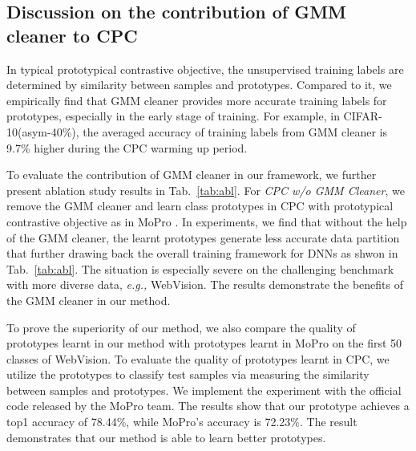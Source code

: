 \documentclass{article} \usepackage{iclr2023_conference,times}
\begin{document}
\subsection{Discussion on the contribution of GMM cleaner to CPC} \label{app:abl}


  In typical prototypical contrastive objective, the unsupervised training labels are determined by similarity between samples and prototypes. Compared to it, we empirically find that GMM cleaner provides more accurate training labels for prototypes, especially in the early stage of training. For example, in CIFAR-10(asym-40\%), the averaged accuracy of training labels from GMM cleaner is 9.7\% higher during the CPC warming up period. 
  
  To evaluate the contribution of GMM cleaner in our framework, we further present ablation study results in Tab.~\ref{tab:abl}. For \emph{CPC w/o GMM Cleaner}, we remove the GMM cleaner and learn class prototypes in CPC with prototypical contrastive objective as in MoPro \citep{li2020mopro}. In experiments, we find that without the help of the GMM cleaner, the learnt prototypes generate less accurate data partition that further drawing back the overall training framework for DNNs as shwon in Tab.~\ref{tab:abl}. The situation is especially severe on the challenging benchmark with more diverse data, \emph{e.g.,} WebVision.  The results demonstrate the benefits of the GMM cleaner in our method. 
  
  To prove the superiority of our method, we also compare the quality of prototypes learnt in our method with prototypes learnt in MoPro \citep{li2020mopro} on the first 50 classes of WebVision.
  To evaluate the quality of prototypes learnt in CPC, we utilize the prototypes to classify test samples via measuring the similarity between samples and prototypes. We implement the experiment with the official code released by the MoPro team. The results show that our prototype achieves a top1 accuracy of 78.44\%, while MoPro's accuracy is 72.23\%. The result demonstrates that our method is able to learn better prototypes.
  
\begin{table}[]
\caption{Ablation study on the contribution of GMM cleaner.The classification accuracy of DNNs is reported. The best results are indicated with  boldface.}\label{tab:abl}
\end{table}
\end{document}
